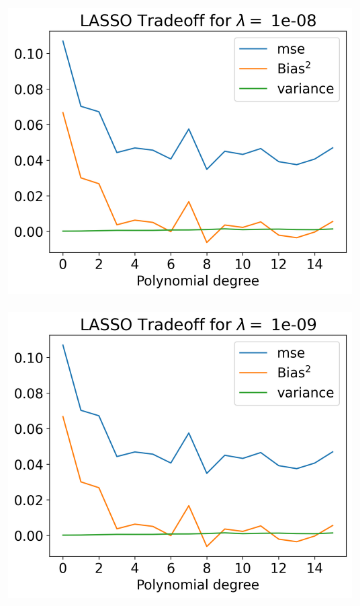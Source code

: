 \documentclass[12pt]{article}
\begin{document}
\begin{figure}[H]
  \begin{subfigure}{.5\textwidth}
    \centering
    \includegraphics[width=\textwidth]{../figures/tradeoff_LASSO_1e-08.png}
    \caption{}
    \label{fig:l_1e-08}
  \end{subfigure}
  \begin{subfigure}{.5\textwidth}
    \centering
    \includegraphics[width=\textwidth]{../figures/tradeoff_LASSO_1e-09.png}
    \caption{}
    \label{fig:l_1e-09}
  \end{subfigure}

\end{figure}
\end{document}
